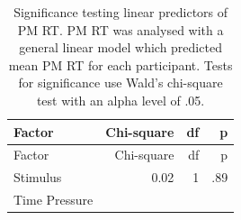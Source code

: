 \documentclass[11pt,]{article}
\begin{document}
\begin{longtable}[]{@{}lrrr@{}}
\caption{Significance testing linear predictors of PM RT. PM RT was
analysed with a general linear model which predicted mean PM RT for each
participant. Tests for significance use Wald's chi-square test with an
alpha level of .05.}\tabularnewline
\toprule
\begin{minipage}[b]{0.32\columnwidth}\raggedright\strut
Factor\strut
\end{minipage} & \begin{minipage}[b]{0.16\columnwidth}\raggedleft\strut
Chi-square\strut
\end{minipage} & \begin{minipage}[b]{0.06\columnwidth}\raggedleft\strut
df\strut
\end{minipage} & \begin{minipage}[b]{0.06\columnwidth}\raggedleft\strut
p\strut
\end{minipage}\tabularnewline
\midrule
\endfirsthead
\toprule
\begin{minipage}[b]{0.32\columnwidth}\raggedright\strut
Factor\strut
\end{minipage} & \begin{minipage}[b]{0.16\columnwidth}\raggedleft\strut
Chi-square\strut
\end{minipage} & \begin{minipage}[b]{0.06\columnwidth}\raggedleft\strut
df\strut
\end{minipage} & \begin{minipage}[b]{0.06\columnwidth}\raggedleft\strut
p\strut
\end{minipage}\tabularnewline
\midrule
\endhead
\begin{minipage}[t]{0.32\columnwidth}\raggedright\strut
Stimulus\strut
\end{minipage} & \begin{minipage}[t]{0.16\columnwidth}\raggedleft\strut
0.02\strut
\end{minipage} & \begin{minipage}[t]{0.06\columnwidth}\raggedleft\strut
1\strut
\end{minipage} & \begin{minipage}[t]{0.06\columnwidth}\raggedleft\strut
.89\strut
\end{minipage}\tabularnewline
\begin{minipage}[t]{0.32\columnwidth}\raggedright\strut
Time Pressure\strut
\end{minipage} & \begin{minipage}[t]{0.16\columnwidth}\raggedleft\strut

\end{minipage}
\end{longtable}
\end{document}
